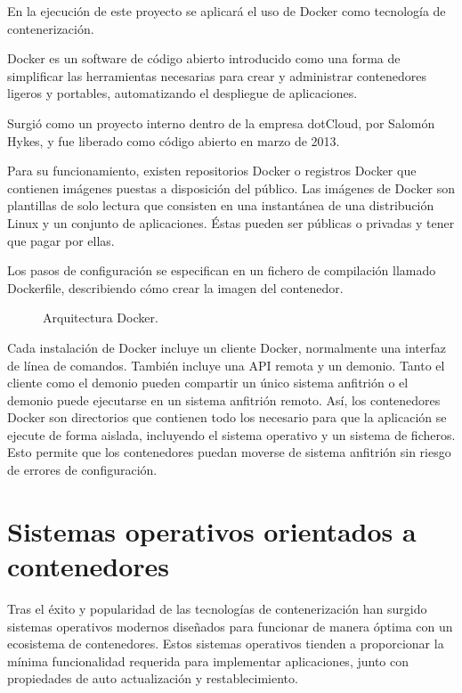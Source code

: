 En la ejecución de este proyecto se aplicará el uso de Docker como tecnología de contenerización.

Docker es un software de código abierto introducido como una forma de simplificar las herramientas necesarias para crear y administrar contenedores ligeros y portables, automatizando el despliegue de aplicaciones.

Surgió como un proyecto interno dentro de la empresa dotCloud, por Salomón Hykes, y fue liberado como código abierto en marzo de 2013.

Para su funcionamiento, existen repositorios Docker o registros Docker que contienen imágenes puestas a disposición del público. Las imágenes de Docker son plantillas de solo lectura que consisten en una instantánea de una distribución Linux y un conjunto de aplicaciones. Éstas pueden ser públicas o privadas y tener que pagar por ellas.

Los pasos de configuración se especifican en un fichero de compilación llamado Dockerfile, describiendo cómo crear la imagen del contenedor.

\begin{figure}[H]
\caption{Arquitectura Docker.\label{fig:figure_placement_example}}
\end{figure}

Cada instalación de Docker incluye un cliente Docker, normalmente una interfaz de línea de comandos. También incluye una API remota y un demonio. Tanto el cliente como el demonio pueden compartir un único sistema anfitrión o el demonio puede ejecutarse en un sistema anfitrión remoto. Así, los contenedores Docker son directorios que contienen todo los necesario para que la aplicación se ejecute de forma aislada, incluyendo el sistema operativo y un sistema de ficheros. Esto permite que los contenedores puedan moverse de sistema anfitrión sin riesgo de errores de configuración.

\section{Sistemas operativos orientados a contenedores}

Tras el éxito y popularidad de las tecnologías de contenerización han surgido sistemas operativos modernos diseñados para funcionar de manera óptima con un ecosistema de contenedores. Estos sistemas operativos tienden a proporcionar la mínima funcionalidad requerida para implementar aplicaciones, junto con propiedades de auto actualización y restablecimiento.


